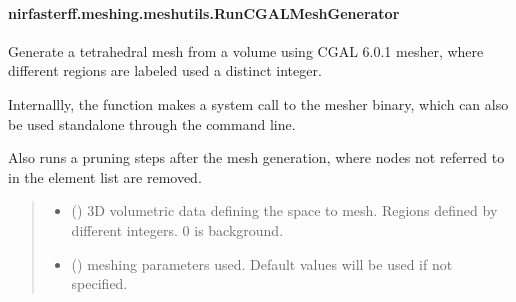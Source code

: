 \documentclass[letterpaper,10pt,english]{sphinxmanual}
\begin{document}
\sphinxstepscope


\paragraph{nirfasterff.meshing.meshutils.RunCGALMeshGenerator}
\label{\detokenize{_autosummary/nirfasterff.meshing.meshutils.RunCGALMeshGenerator:nirfasterff-meshing-meshutils-runcgalmeshgenerator}}\label{\detokenize{_autosummary/nirfasterff.meshing.meshutils.RunCGALMeshGenerator::doc}}

\begin{fulllineitems}
\label{\detokenize{_autosummary/nirfasterff.meshing.meshutils.RunCGALMeshGenerator:nirfasterff.meshing.meshutils.RunCGALMeshGenerator}}
\pysigstartsignatures
\pysiglinewithargsret
{}
{\sphinxparamcomma {}}
{}
\pysigstopsignatures
\sphinxAtStartPar
Generate a tetrahedral mesh from a volume using CGAL 6.0.1 mesher, where different regions are labeled used a distinct integer.

\sphinxAtStartPar
Internallly, the function makes a system call to the mesher binary, which can also be used standalone through the command line.

\sphinxAtStartPar
Also runs a pruning steps after the mesh generation, where nodes not referred to in the element list are removed.
\begin{quote}\begin{description}
\begin{itemize}
\item {} 
\sphinxAtStartPar
{} () \textendash{} 3D volumetric data defining the space to mesh. Regions defined by different integers. 0 is background.

\item {} 
\sphinxAtStartPar
{} ({\hyperref[\detokenize{_autosummary/nirfasterff.utils.MeshingParams:nirfasterff.utils.MeshingParams}]{}}\sphinxstyleliteralemphasis{\sphinxupquote{, }}) \textendash{} 
\sphinxAtStartPar
meshing parameters used. Default values will be used if not specified.


\end{itemize}
\end{description}
\end{quote}
\end{fulllineitems}
\end{document}
